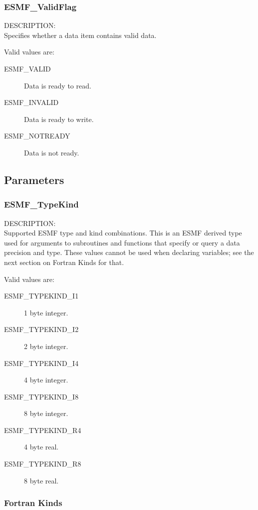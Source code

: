 \subsubsection{ESMF\_ValidFlag}
\label{opt:validflag}
{\sf DESCRIPTION:\\}
Specifies whether a data item contains valid data.

Valid values are:
\begin{description}
   \item [ESMF\_VALID] 
         Data is ready to read.
   \item [ESMF\_INVALID]
         Data is ready to write.
   \item [ESMF\_NOTREADY]
         Data is not ready.
\end{description}


\subsection{Parameters}

\subsubsection{ESMF\_TypeKind}
\label{opt:typekind}

{\sf DESCRIPTION:\\}
Supported ESMF type and kind combinations.   
This is an ESMF derived type used for arguments to subroutines 
and functions that specify or query a data precision and type.
These values cannot be used when declaring variables; see the next 
section on Fortran Kinds for that.

Valid values are:
\begin{description}
\item [ESMF\_TYPEKIND\_I1]
      1 byte integer.
\item [ESMF\_TYPEKIND\_I2]
      2 byte integer.
\item [ESMF\_TYPEKIND\_I4]
      4 byte integer.
\item [ESMF\_TYPEKIND\_I8]
      8 byte integer.
\item [ESMF\_TYPEKIND\_R4]
      4 byte real.
\item [ESMF\_TYPEKIND\_R8]
      8 byte real.
\end{description}

\subsubsection{Fortran Kinds}

